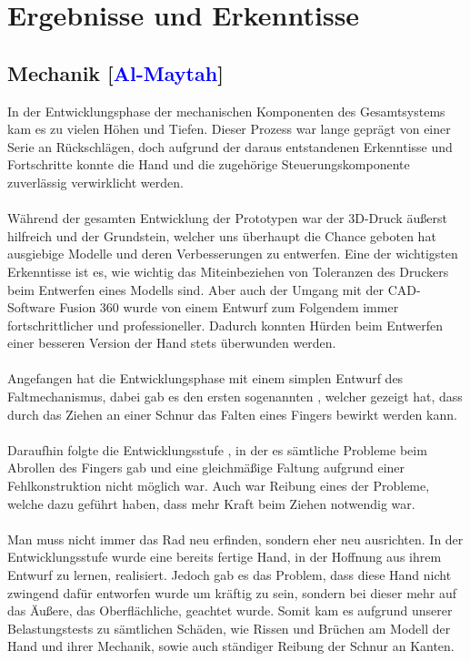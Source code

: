 \documentclass[titlepage,12pt,twoside]{article}
\begin{document}
\newpage
\section{Ergebnisse und Erkenntisse}
\label{chap:Ergebnisse und Erkenntisse}
\subsection{Mechanik [\textcolor{blue}{Al-Maytah}]}

In der Entwicklungsphase der mechanischen Komponenten des Gesamtsystems kam es zu vielen Höhen und Tiefen.
Dieser Prozess war lange geprägt von einer Serie an Rückschlägen, doch aufgrund der daraus entstandenen
Erkenntisse und Fortschritte konnte die Hand und die zugehörige Steuerungskomponente zuverlässig verwirklicht werden. \\
\\
Während der gesamten Entwicklung der Prototypen war der 3D-Druck äußerst hilfreich und der Grundstein, welcher uns
überhaupt die Chance geboten hat ausgiebige Modelle und deren Verbesserungen zu entwerfen. Eine der wichtigsten Erkenntisse
ist es, wie wichtig das Miteinbeziehen von Toleranzen des Druckers beim Entwerfen eines Modells sind. Aber auch der Umgang mit der CAD-Software Fusion 360 
wurde von einem Entwurf zum Folgendem immer fortschrittlicher und professioneller. Dadurch konnten Hürden beim Entwerfen einer besseren Version der 
Hand stets überwunden werden. \\
\\
Angefangen hat die Entwicklungsphase mit einem simplen Entwurf des Faltmechanismus, dabei gab es den ersten sogenannten , welcher gezeigt hat, dass durch das Ziehen an einer Schnur das Falten eines Fingers bewirkt werden kann. \\
\\
Daraufhin folgte die Entwicklungsstufe , in der es sämtliche Probleme beim Abrollen des Fingers gab
und eine gleichmäßige Faltung aufgrund einer Fehlkonstruktion nicht möglich war. Auch war Reibung eines
der Probleme, welche dazu geführt haben, dass mehr Kraft beim Ziehen notwendig war. \\
\\
Man muss nicht immer das Rad neu erfinden, sondern eher neu ausrichten. In der Entwicklungsstufe  wurde eine bereits fertige Hand, in der Hoffnung aus ihrem Entwurf zu lernen, realisiert. Jedoch gab es das Problem, dass diese Hand nicht zwingend dafür entworfen wurde um kräftig zu sein, sondern bei dieser mehr auf das Äußere, das Oberflächliche, geachtet wurde. Somit kam es aufgrund unserer Belastungstests zu sämtlichen Schäden, wie Rissen und Brüchen am Modell der Hand und ihrer Mechanik, sowie auch ständiger Reibung der Schnur an Kanten. \\
\end{document}
